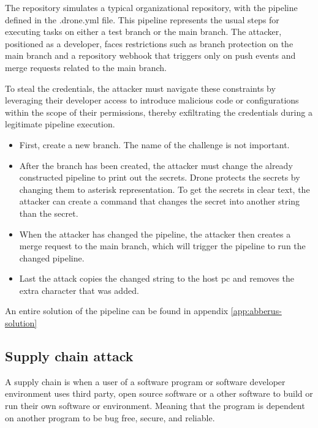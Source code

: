 The repository simulates a typical organizational repository, with the pipeline defined in the .drone.yml file. 
This pipeline represents the usual steps for executing tasks on either a test branch or the main branch. 
The attacker, positioned as a developer, faces restrictions such as branch protection on the main branch and a repository webhook that triggers only on push events and merge requests related to the main branch.

To steal the credentials, the attacker must navigate these constraints by leveraging their developer access to 
introduce malicious code or configurations within the scope of their permissions, 
thereby exfiltrating the credentials during a legitimate pipeline execution.
\begin{itemize}
    \item First, create a new branch. The name of the challenge is not important.
    \item After the branch has been created, the attacker must change the already constructed pipeline to print out the secrets.
    Drone protects the secrets by changing them to asterisk representation.
    To get the secrets in clear text, the attacker can create a command that changes the secret into another string than the secret.
    \begin{center}
    \end{center}
    \item When the attacker has changed the pipeline, the attacker then creates a merge request to the main branch,
    which will trigger the pipeline to run the changed pipeline.
    \item Last the attack copies the changed string to the host pc and removes the extra character that was added.
\end{itemize}

An entire solution of the pipeline can be found in appendix \ref{app:abberus-solution}


\subsection{Supply chain attack}
\label{sec:supply_chain_attack}
A supply chain is when a user of a software program or software developer environment uses
third party, open source software or a other software to build or run their own software or environment.
Meaning that the program is dependent on another program to be bug free, secure, and reliable.

